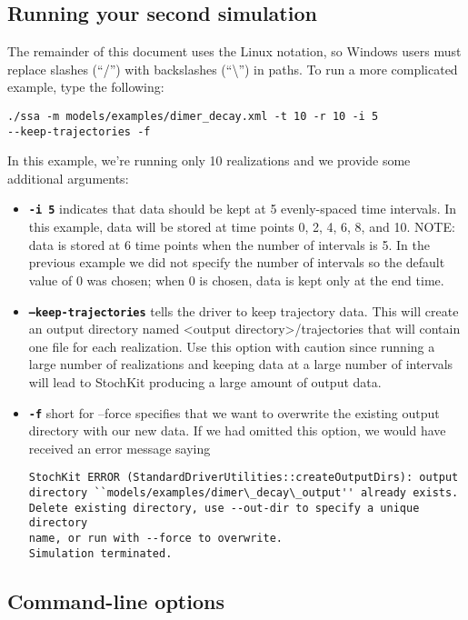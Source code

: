 \documentclass[11pt,letterpaper]{article}
\begin{document}
\subsection{Running your second simulation}
The remainder of this document uses the Linux notation, so Windows users must replace slashes (``/'') with backslashes (``\textbackslash'') in paths.
To run a more complicated example, type the following:
\begin{lstlisting}
./ssa -m models/examples/dimer_decay.xml -t 10 -r 10 -i 5 
--keep-trajectories -f
\end{lstlisting}
In this example, we’re running only 10 realizations and we provide some additional arguments:
\begin{itemize}
    \item \texttt{\textbf{-i 5}} indicates that data should be kept at 5 evenly-spaced time intervals.  In this example, data will be stored at time points 0, 2, 4, 6, 8, and 10.  NOTE: data is stored at 6 time points when the number of intervals is 5.  In the previous example we did not specify the number of intervals so the default value of 0 was chosen; when 0 is chosen, data is kept only at the end time.
    \item \texttt{\textbf{--keep-trajectories}} tells the driver to keep trajectory data.  This will create an output directory named <output directory>/trajectories that will contain one file for each realization.  Use this option with caution since running a large number of realizations and keeping data at a large number of intervals will lead to StochKit producing a large amount of output data.
    \item \texttt{\textbf{-f}} short for --force specifies that we want to overwrite the existing output directory with our new data.  If we had omitted this option, we would have received an error message saying 
        \begin{lstlisting}
StochKit ERROR (StandardDriverUtilities::createOutputDirs): output 
directory ``models/examples/dimer\_decay\_output'' already exists.
Delete existing directory, use --out-dir to specify a unique directory 
name, or run with --force to overwrite.
Simulation terminated.
\end{lstlisting}
\end{itemize}

\subsection{Command-line options}
\end{document}
